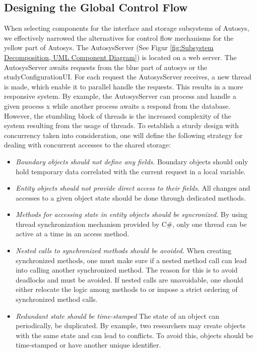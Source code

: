 \subsection{Designing the Global Control Flow}
When selecting components for the interface and storage subsystems of Autosys, we effectively narrowed the alternatives for control flow mechanisms for the yellow part of Autosys. The AutosysServer (See Figur \ref{fig:Subsystem Decomposition, UML Component Diagram}) is located on a web server. The AutosysServer awaits requests from the blue part of autosys or the studyConfigurationUI. For each request the AutosysServer receives, a new thread is made, which enable it to parallel handle the requests. This results in a more responsive system. By example, the AutosysServer can process and handle a given process x while another process awaits a respond from the database. However, the stumbling block of threads is the increased complexity of the system resulting from the usage of threads. To establish a sturdy design with concurrency taken into consideration, one will define the following strategy for dealing with concurrent accesses to the shared storage:
\begin{itemize}
	\item \textit{Boundary objects should not define any fields.} Boundary objects should only hold temporary data correlated with the current request in a local variable.
	\item \textit{Entity objects should not provide direct access to their fields.} All changes and accesses to a given object state should be done through dedicated methods. 
	
	\item \textit{Methods for accessing state in entity objects should be syncronized.} By using thread synchronization mechanism provided by C\#, only one thread can be active at a time in an access method.
	
	\item \textit{Nested calls to synchronized methods should be avoided.} When creating synchronized methods, one must make sure if a nested method call can lead into calling another synchronized method. The reason for this is to avoid deadlocks and must be avoided. If nested calls are unavoidable, one should either relocate the logic among methods to or impose a strict ordering of synchronized method calls.
	\item \textit{Redundant state should be time-stamped} The state of an object can periodically, be duplicated. By example, two researchers may create objects with the same state and can lead to conflicts. To avoid this, objects should be time-stamped or have another unique identifier.

\end{itemize}


